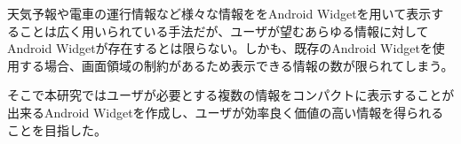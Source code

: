 
\begin{jabstract}
天気予報や電車の運行情報など様々な情報ををAndroid Widgetを用いて表示することは広く用いられている手法だが、ユーザが望むあらゆる情報に対してAndroid Widgetが存在するとは限らない。しかも、既存のAndroid Widgetを使用する場合、画面領域の制約があるため表示できる情報の数が限られてしまう。

そこで本研究ではユーザが必要とする複数の情報をコンパクトに表示することが出来るAndroid Widgetを作成し、ユーザが効率良く価値の高い情報を得られることを目指した。

\end{jabstract}
